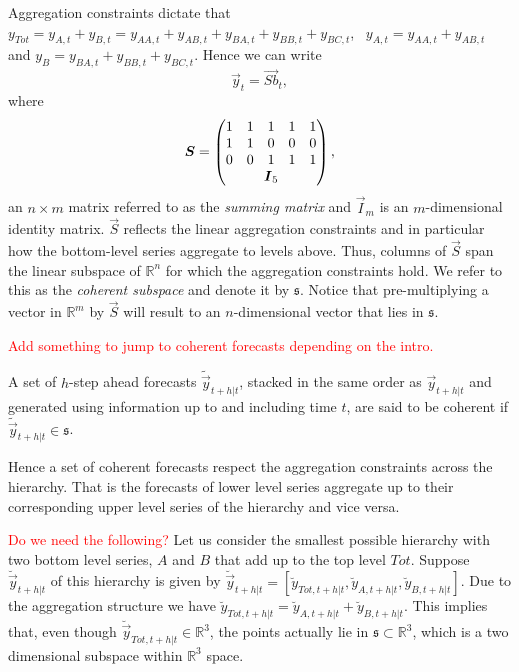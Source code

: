 \documentclass[graybox]{svmult}
\begin{document}
Aggregation constraints dictate that $y_{Tot}=y_{A,t}+y_{B,t}=y_{AA,t}+y_{AB,t}+y_{BA,t}+y_{BB,t}+y_{BC,t}$,~ $y_{A,t}=y_{AA,t}+y_{AB,t}$ and $y_{B}=y_{BA,t}+y_{BB,t}+y_{BC,t}$. Hence we can write
\begin{equation}\label{eq:summing matrix}
\vec{y}_t = \vec{Sb}_t,
\end{equation}
where \begin{equation*}
\vec{S} = \begin{pmatrix}
1& 1& 1& 1 & 1 \\
1& 1& 0& 0 & 0\\
0& 0& 1& 1 & 1\\
& \multicolumn{3}{c}{\vec{I}_5} &
\end{pmatrix},
\end{equation*}
an $n\times m$ matrix referred to as the \textit{summing matrix} and $\vec{I}_m$ is an $m$-dimensional identity matrix. $\vec{S}$ reflects the linear aggregation constraints and in particular how the bottom-level series aggregate to levels above. Thus, columns of $\vec{S}$ span the linear subspace of $\mathbb{R}^n$ for which the aggregation constraints hold. We refer to this as the \textit{coherent subspace} and denote it by $\mathfrak{s}$. Notice that pre-multiplying a vector in $\mathbb{R}^m$ by $\vec{S}$ will result to an $n$-dimensional vector that lies in $\mathfrak{s}$.

\textcolor{red}{Add something to jump to coherent forecasts depending on the intro.}

\begin{definition}
A set of $h$-step ahead forecasts $\tilde{\vec{y}}_{t+h|t}$, stacked in the same order as $\vec{y}_{t+h|t}$ and generated using information up to and including time $t$,
are said to be coherent if $\tilde{\vec{y}}_{t+h|t} \in \mathfrak{s}$.
  \label{def:coherence}
\end{definition}

Hence a set of coherent forecasts respect the aggregation constraints across the hierarchy. That is the forecasts of lower level series aggregate up to their corresponding upper level series of the hierarchy and vice versa.

\textcolor{red}{Do we need the following?}
Let us consider the smallest possible hierarchy with two bottom level series, $A$ and $B$ that add up to the top level $Tot$. Suppose $\breve{\vec{y}}_{t+h|t}$ of this hierarchy is given by $\breve{\vec{y}}_{t+h|t} = [\breve{y}_{Tot,t+h|t},\breve{y}_{A,t+h|t}, \breve{y}_{B,t+h|t}]$. Due to the aggregation structure we have $\breve{y}_{Tot,t+h|t}=\breve{y}_{A,t+h|t}+\breve{y}_{B,t+h|t}$. This implies that, even though  $\breve{\vec{y}}_{Tot,t+h|t} \in \mathbb{R}^3$, the points actually lie in $\mathfrak{s}\subset \mathbb{R}^3$, which is a two dimensional subspace within $\mathbb{R}^3$ space.
\end{document}
